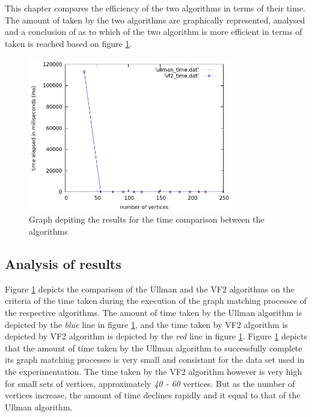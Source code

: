 \label{Time Results}
This chapter compares the efficiency of the two algorithms in terms of their time. The amount of taken by the two algorithms are graphically 
represented, analysed and a conclusion of as to which of the two algorithm is more efficient in terms of taken is reached based on figure \ref{fig:time_comparison}.
\begin{figure}[H]
  \begin{center}
      \includegraphics[width=0.8\textwidth]{time_comparison.png}
  \end{center}    
  \caption{Graph depiting the results for the time comparison between the algorithms}
  \label{fig:time_comparison}
\end{figure}

\subsection{Analysis of results}
Figure \ref{fig:time_comparison} depicts the comparison of the Ullman and the VF2 algorithms on the criteria of the time taken during the execution of the graph matching processes
of the respective algorithms.\newline\newline
The amount of time taken by the Ullman algorithm is depicted by the \textit{blue} line in figure \ref{fig:time_comparison}, and the time taken by VF2 algorithm 
is depicted by VF2 algorithm is depicted by the \textit{red} line in figure \ref{fig:time_comparison}.\newline\newline
Figure \ref{fig:time_comparison} depicts that the amount of time taken by the Ullman algorithm to successfully complete its graph matching processes is very 
small and consistant for the data set used in the experimentation.\newline\newline
The time taken by the VF2 algorithm however is very high for small sets of vertices, approximately \textit{40 - 60} vertices. But as the number of vertices 
increase, the amount of time declines rapidly and it equal to that of the Ullman algorithm.

